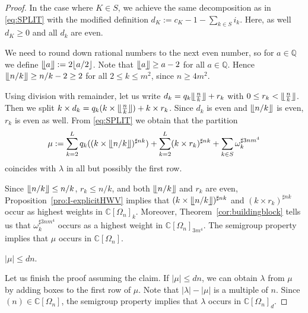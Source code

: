 \documentclass[11pt]{amsart}
\newcommand{\Det}{\Omega}
\def\la{\lambda}
\newcommand{\IC}{\ensuremath{\mathbb{C}}}
\newcommand{\IQ}{\ensuremath{\mathbb{Q}}}
\numberwithin{equation}{section}
\begin{document}
\begin{proof}
In the case where $K\in S$, we achieve the same decomposition as in \eqref{eq:SPLIT} 
with the modified definition
$d_K:=c_K - 1- \sum_{k \in S} i_k$. Here, as well $d_K \geq 0$ and all $d_k$ are even. 

We need to round down rational numbers to the next even number,
so for $a\in\IQ$ we define 
$\llfloor a \rrfloor := 2 \lfloor a/2 \rfloor$. 
Note that $\llfloor a \rrfloor \ge a - 2$ for all $a\in\IQ$. Hence 
$\llfloor n/k\rrfloor \geq n/k -2 \ge 2$ for all $2 \leq k \leq m^2$,
since $n \geq 4m^2$.  

Using division with remainder, let us write 
$d_k = q_k \llfloor \frac{n}{k}\rrfloor + r_k$ with $0\le r_k < \llfloor \frac{n}{k}\rrfloor$. 
Then we split 
$k\times d_k = q_k (k \times \llfloor \frac{n}{k} \rrfloor ) + k\times r_k$.
Since $d_k$ is even and $\llfloor n/k\rrfloor$ is even, $r_k$ is even as well. 
From \eqref{eq:SPLIT} we obtain that the partition 
\begin{equation}\label{eq:musplit}
\mu := 
\sum_{k=2}^{L} q_k ((k \times \llfloor n/k\rrfloor)^{\sharp nk}) 
+ \sum_{k=2}^{L} (k \times r_k)^{\sharp nk} 
 + \sum_{k\in S} \omega_k^{\sharp 3nm^4} 
\end{equation}
coincides with $\la$ in all but possibly the first row.

Since $\llfloor n/k\rrfloor \leq n/k$, $r_k \leq n/k$,
and both $\llfloor n/k\rrfloor$ and $r_k$ are even, 
Proposition~\ref{pro:I-explicitHWV} implies that 
$(k \times \llfloor n/k\rrfloor)^{\sharp nk}$ 
and $(k \times r_k)^{\sharp nk}$
occur as highest weights in $\IC[\Det_n]_k$.
Moreover, 
Theorem~\ref{cor:buildingblock} tells us that 
$\omega_k^{\sharp 3nm^4}$ 
occurs as a highest weight in $\IC[\Det_n]_{3m^4}$.
The semigroup property implies that $\mu$ occurs in $\IC[\Det_n]$.
\medskip 

 $|\mu| \le dn$. 
\medskip 

Let us finish the proof assuming the claim. 
If $|\mu| \le dn$, we can obtain $\la$ from $\mu$ by adding boxes to the first row of $\mu$. 
Note that $|\la|-|\mu|$ is a multiple of $n$. 
Since $(n)\in \IC[\Det_n]$, 
the semigroup property implies that $\la$ occurs in $\IC[\Det_n]_d$.
\smallskip 


\end{proof}
\end{document}
